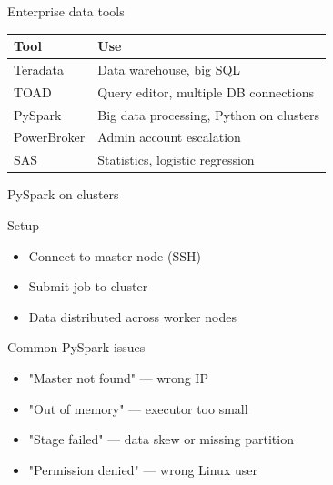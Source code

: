 \documentclass[aspectratio=169, 11pt]{beamer}
\begin{document}
	\begin{frame}{Enterprise data tools}
		\tiny
		\begin{tabular}{p{3cm} p{6cm}}
			\toprule
			\textbf{Tool} & \textbf{Use} \\
			\midrule
			Teradata & Data warehouse, big SQL \\
			TOAD & Query editor, multiple DB connections \\
			PySpark & Big data processing, Python on clusters \\
			PowerBroker & Admin account escalation \\
			SAS & Statistics, logistic regression \\
			\bottomrule
		\end{tabular}
	\end{frame}
	
	\begin{frame}{PySpark on clusters}
		\tiny
		\begin{block}{Setup}
			\begin{itemize}
				\item Connect to master node (SSH)
				\item Submit job to cluster
				\item Data distributed across worker nodes
			\end{itemize}
		\end{block}
		\begin{block}{Common PySpark issues}
			\tiny
			\begin{itemize}
				\item "Master not found" — wrong IP
				\item "Out of memory" — executor too small
				\item "Stage failed" — data skew or missing partition
				\item "Permission denied" — wrong Linux user
			\end{itemize}
		\end{block}
	\end{frame}
	
\end{document}
